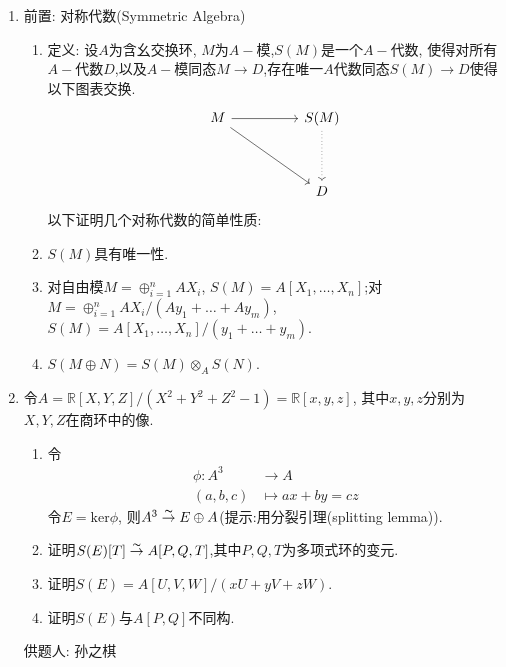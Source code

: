 \documentclass[lang=cn,12pt,a4paper]{elegantpaper.cls}
\begin{document}
\begin{enumerate}
\begin{enumerate}
		\item 前置: 对称代数(Symmetric Algebra)
		\begin{enumerate}
			\item 定义: 设$A$为含幺交换环, $M$为$A-$模,$S(M)$是一个$A-$代数, 使得对所有$A-$代数$D$,以及$A-$模同态$M\rightarrow D$,存在唯一$A$代数同态$S(M)\rightarrow D$使得以下图表交换.
			\[\begin{tikzcd}
				M && {S(M)} \\
				\\
				&& D
				\arrow[from=1-1, to=1-3]
				\arrow[from=1-1, to=3-3]
				\arrow[dotted, from=1-3, to=3-3]
			\end{tikzcd}\]
			以下证明几个对称代数的简单性质:
			\item $S(M)$具有唯一性.
			\item 对自由模$M=\oplus_{i=1}^n AX_i$, $S(M)=A[X_1,\dots,X_n]$;对$M=\oplus_{i=1}^n AX_i/(Ay_1+\dots+Ay_m)$, $S(M)=A[X_1,\dots,X_n]/(y_1+\dots+y_m).$
			\item $S(M\oplus N)=S(M)\otimes_A S(N).$
		\end{enumerate}
		\item 令$A=\mathbb{R}[X,Y,Z]/(X^2+Y^2+Z^2-1)=\mathbb{R}[x,y,z]$, 其中$x,y,z$分别为$X,Y,Z$在商环中的像.
		\begin{enumerate}
			\item 令
			\begin{align*}
				\phi:A^3&\rightarrow A \\ (a,b,c)&\longmapsto ax+by=cz
			\end{align*}
			令$E=\mathrm{ker}\phi$, 则$A^3\stackrel{\thicksim }{\rightarrow}E\oplus A$(提示:用分裂引理(splitting lemma)).
			\item 证明$S(E)[T]\stackrel{\thicksim }{\rightarrow}A[P,Q,T]$,其中$P,Q,T$为多项式环的变元.
			\item 证明$S(E)=A[U,V,W]/(xU+yV+zW)$.
			\item 证明$S(E)$与$A[P,Q]$不同构.
		\end{enumerate}
		\begin{flushright}
			供题人: 孙之棋
		\end{flushright}
		
		
	

\end{enumerate}
\end{enumerate}
\end{document}
